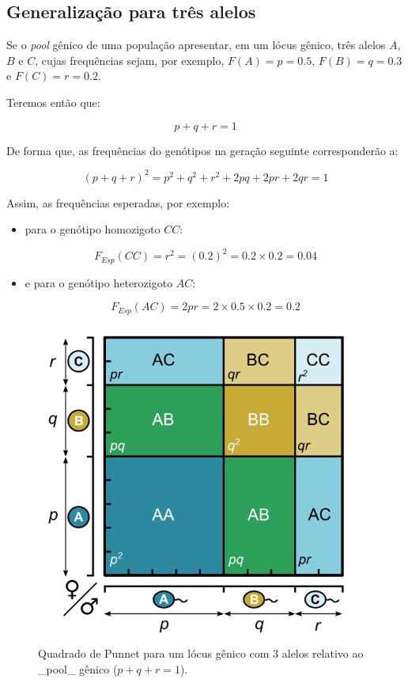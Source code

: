 \documentclass[
]{book}
\providecommand{\tightlist}{%
  \setlength{\itemsep}{0pt}\setlength{\parskip}{0pt}}
\begin{document}
\hypertarget{generalizauxe7uxe3o-para-truxeas-alelos}{%
\subsection{Generalização para três alelos}\label{generalizauxe7uxe3o-para-truxeas-alelos}}

Se o \emph{pool} gênico de uma população apresentar, em um lócus gênico, três alelos \(A\), \(B\) e \(C\), cujas frequências sejam, por exemplo, \(F(A) = p = 0.5\), \(F(B) = q = 0.3\) e \(F(C) = r = 0.2\).

Teremos então que:

\[p + q +r = 1\]

De forma que, as frequências do genótipos na geração seguinte corresponderão a:

\[\left( p + q + r\right)^2 = p^2 + q^2 + r^2 + 2pq + 2pr + 2qr = 1\]

Assim, as frequências esperadas, por exemplo:

\begin{itemize}
\tightlist
\item
  para o genótipo homozigoto \(CC\):
\end{itemize}

\[F_{Esp}(CC) = r^2 = (0.2)^2 = 0.2 \times 0.2 = 0.04\]

\begin{itemize}
\tightlist
\item
  e para o genótipo heterozigoto \(AC\):
\end{itemize}

\[F_{Esp}(AC) = 2pr = 2 \times 0.5 \times 0.2 = 0.2\]

\begin{figure}

{\centering \includegraphics[width=400px]{figs/punnett_3alelles} 

}

\caption{Quadrado de Punnet para um lócus gênico com 3 alelos relativo ao _pool_ gênico ($p+q+r=1$).}\label{fig:hwpunnet3}
\end{figure}
\end{document}
